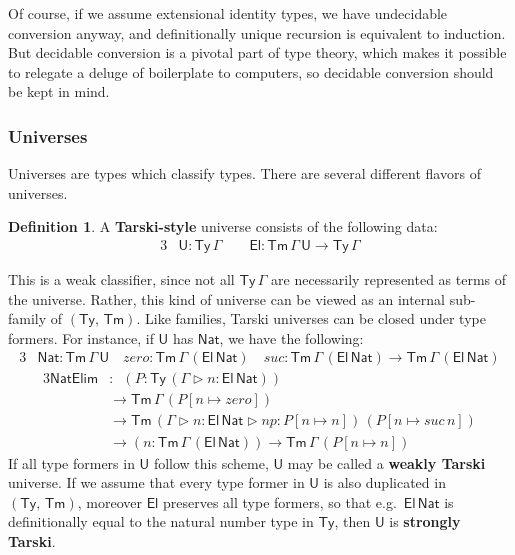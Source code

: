 \documentclass[12pt,a4paper,twoside,openany]{book}
\theoremstyle{remark}
\theoremstyle{definition}
\newtheorem{mydefinition}{Definition}
\theoremstyle{theorem}
\newcommand{\mi}[1]{\mathit{#1}}
\newcommand{\ms}[1]{\mathsf{#1}}
\newcommand{\Tm}{\mathsf{Tm}}
\newcommand{\Ty}{\mathsf{Ty}}
\newcommand{\U}{\mathsf{U}}
\newcommand{\El}{\mathsf{El}}
\newcommand{\ext}{\triangleright}
\newcommand{\Nat}{\ms{Nat}}
\begin{document}
Of course, if we assume extensional identity types, we have undecidable
conversion anyway, and definitionally unique recursion is equivalent to
induction. But decidable conversion is a pivotal part of type theory, which
makes it possible to relegate a deluge of boilerplate to computers, so
decidable conversion should be kept in mind.

\subsubsection{Universes}

Universes are types which classify types. There are several different flavors of
universes.

\begin{mydefinition} A \textbf{Tarski-style} universe consists of
the following data:
\begin{alignat*}{3}
  & \U : \Ty\,\Gamma\hspace{2em}\El : \Tm\,\Gamma\,\U \to \Ty\,\Gamma
\end{alignat*}
\end{mydefinition}
This is a weak classifier, since not all $\Ty\,\Gamma$ are necessarily
represented as terms of the universe. Rather, this kind of universe can be
viewed as an internal sub-family of $(\Ty,\,\Tm)$. Like families, Tarski
universes can be closed under type formers. For instance, if $\U$ has $\Nat$,
we have the following:
\begin{alignat*}{3}
  &\Nat : \Tm\,\Gamma\,\U
    \hspace{1em}\mi{zero} : \Tm\,\Gamma\,(\El\,\Nat)
    \hspace{1em}\mi{suc} : \Tm\,\Gamma\,(\El\,\Nat) \to \Tm\,\Gamma\,(\El\,\Nat)
\end{alignat*}
\vspace{-2em}
\begin{alignat*}{3}
  \ms{NatElim} &:\,\,\,(P : \Ty\,(\Gamma\ext n : \El\,\Nat))\\
  &\to \Tm\,\Gamma\,(P[n \mapsto \mi{zero}])\\
  &\to \Tm\,(\Gamma\ext n : \El\,\Nat \ext \mi{np} : P[n \mapsto n])\,(P[n \mapsto \mi{suc}\,n]) \\
  &\to (n : \Tm\,\Gamma\,(\El\,\Nat)) \to \Tm\,\Gamma\,(P[n \mapsto n])
\end{alignat*}
If all type formers in $\U$ follow this scheme, $\U$ may be called a
\textbf{weakly Tarski} universe. If we assume that every type former in $\U$ is
also duplicated in $(\Ty,\,\Tm)$, moreover $\El$ preserves all type formers, so
that e.g.\ $\El\,\Nat$ is definitionally equal to the natural number type in
$\Ty$, then $\U$ is \textbf{strongly Tarski}.
\end{document}
